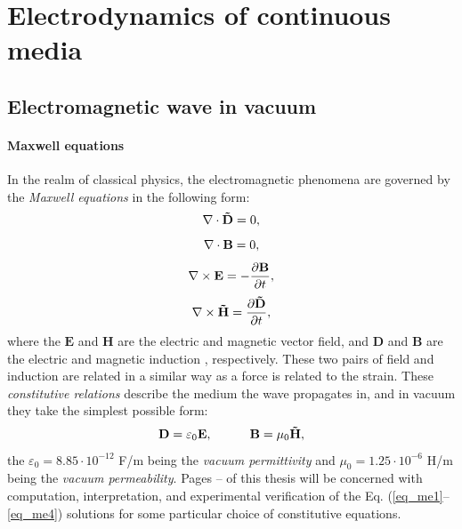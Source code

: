 \documentclass[letterpaper,12pt]{report}
\begin{document}


\section{Electrodynamics of continuous media} %
\subsection{Electromagnetic wave in vacuum} %
\paragraph{Maxwell equations} In the realm of classical physics, the electromagnetic phenomena are governed by the \textit{Maxwell equations} in the following form: %
\begin{equation} \nabla \cdot  \mathbf{\tilde{D}} = 0, \label{eq_me1}\end{equation}  
\begin{equation} \nabla \cdot  \mathbf{B} = 0, \label{eq_me2}\end{equation}  
\begin{equation} \nabla \times \mathbf{E} = -\frac{\partial \mathbf{B}} {\partial t}, \label{eq_me3}\end{equation}  
\begin{equation} \nabla \times \mathbf{\tilde{H}} =  \frac{\partial \mathbf{\tilde{D}}} {\partial t}, \label{eq_me4}\end{equation}  
where the $\mathbf{E}$ and $\mathbf{H}$ are the electric and magnetic vector field, and $\mathbf{D}$ and $\mathbf{B}$ are the electric and magnetic induction %
, respectively. These two pairs of field and induction are related in a similar way as a force is related to the strain. These \textit{constitutive relations} describe the medium the wave propagates in, and in vacuum they take the simplest possible form:
\begin{equation} 
\mathbf{D} = \varepsilon_0	\mathbf{E}, \quad\quad\quad 
\mathbf{B} = \mu_0			\mathbf{\tilde{H}},
\label{eq_ce}\end{equation}
the $\varepsilon_0 = 8.85\cdot10^{-12}$ F/m being the \textit{vacuum permittivity} and $\mu_0 = 1.25\cdot10^{-6}$ H/m being the \textit{vacuum permeability}. 
Pages \pageref{starttext}--\pageref{endtext} of this thesis will be concerned with computation, interpretation, and experimental verification of the Eq. (\ref{eq_me1}--\ref{eq_me4}) solutions for some particular choice of constitutive equations.
\label{starttext}
\end{document}
